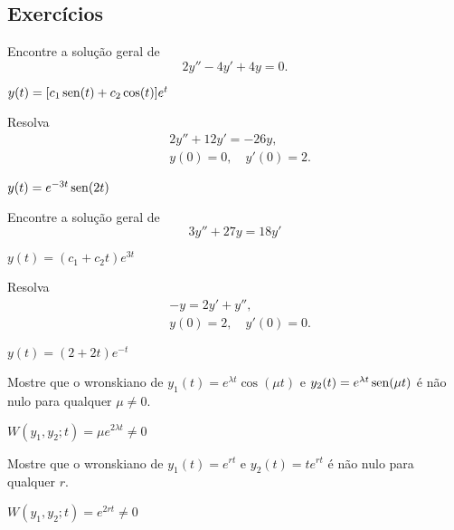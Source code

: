 \subsection*{Exercícios}

\begin{exer}
  Encontre a solução geral de
  \begin{equation}
    2y'' - 4y' + 4y = 0.
  \end{equation}
\end{exer}
\begin{resp}
  $y(t) = [c_1\operatorname{sen}(t) + c_2\cos(t)]e^{t}$
\end{resp}

\begin{exer}
  Resolva
  \begin{align}
    &2y'' + 12y' = -26y,\\
    &y(0) = 0,\quad y'(0) = 2.
  \end{align}
\end{exer}
\begin{resp}
  $y(t) = e^{-3t}\operatorname{sen}(2t)$
\end{resp}

\begin{exer}
  Encontre a solução geral de
  \begin{equation}
    3y'' + 27y = 18y'
  \end{equation}
\end{exer}
\begin{resp}
  $y(t) = (c_1 + c_2t)e^{3t}$
\end{resp}

\begin{exer}
  Resolva
  \begin{align}
    &-y = 2y' + y'',\\
    &y(0) = 2,\quad y'(0) = 0.
  \end{align}
\end{exer}
\begin{resp}
  $y(t) = (2 + 2t)e^{-t}$
\end{resp}

\begin{ex}
  Mostre que o wronskiano de $y_1(t) = e^{\lambda t}\cos(\mu t)$ e $y_2(t) = e^{\lambda t}\operatorname{sen}(\mu t)$ é não nulo para qualquer $\mu\neq 0$.
\end{ex}
\begin{resp}
  $W(y_1,y_2;t) = \mu e^{2\lambda t} \neq 0$
\end{resp}

\begin{ex}
  Mostre que o wronskiano de $y_1(t) = e^{rt}$ e $y_2(t) = te^{rt}$ é não nulo para qualquer $r$.  
\end{ex}
\begin{resp}
  $W(y_1,y_2;t) = e^{2rt} \neq 0$
\end{resp}

